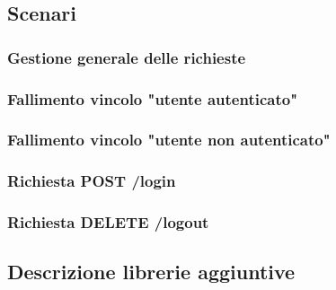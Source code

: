 	\subsection{Scenari}
		\subsubsection{Gestione generale delle richieste}
		\subsubsection{Fallimento vincolo "utente autenticato"}
		\subsubsection{Fallimento vincolo "utente non autenticato"}
		\subsubsection{Richiesta POST /login}
		\subsubsection{Richiesta DELETE /logout}

	\subsection{Descrizione librerie aggiuntive}
